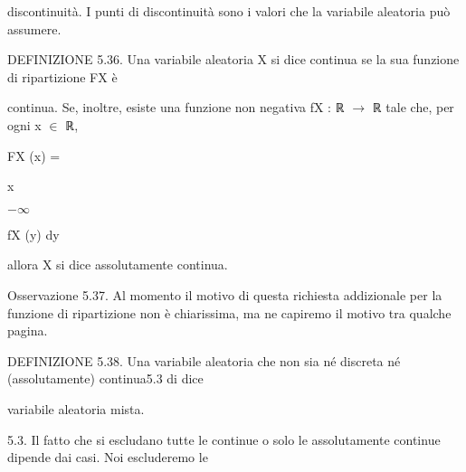 \documentclass[a4paper,portrait,12pt]{article}
\begin{document}
\begin{flushleft}
discontinuit\`{a}. I punti di discontinuit\`{a} sono i valori che la variabile aleatoria pu\`{o} assumere.
\end{flushleft}


\begin{flushleft}
DEFINIZIONE 5.36. Una variabile aleatoria X si dice continua se la sua funzione di ripartizione FX \`{e}
\end{flushleft}


\begin{flushleft}
continua. Se, inoltre, esiste una funzione non negativa fX : ℝ $\rightarrow$ ℝ tale che, per ogni x $\in$ ℝ,
\end{flushleft}


\begin{flushleft}
FX (x) =
\end{flushleft}





\begin{flushleft}
x
\end{flushleft}


$-$$\infty$





\begin{flushleft}
fX (y) dy
\end{flushleft}





\begin{flushleft}
allora X si dice assolutamente continua.
\end{flushleft}


\begin{flushleft}
Osservazione 5.37. Al momento il motivo di questa richiesta addizionale per la funzione di ripartizione non \`{e} chiarissima, ma ne capiremo il motivo tra qualche pagina.
\end{flushleft}


\begin{flushleft}
DEFINIZIONE 5.38. Una variabile aleatoria che non sia n\'{e} discreta n\'{e} (assolutamente) continua5.3 di dice
\end{flushleft}


\begin{flushleft}
variabile aleatoria mista.
\end{flushleft}


\begin{flushleft}
5.3. Il fatto che si escludano tutte le continue o solo le assolutamente continue dipende dai casi. Noi escluderemo le
\end{flushleft}
\end{document}

